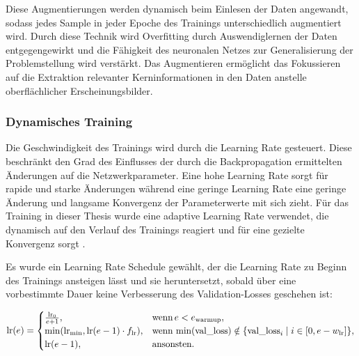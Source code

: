 \vspace{\baselineskip}

Diese Augmentierungen werden dynamisch beim Einlesen der Daten angewandt, sodass jedes Sample in jeder Epoche des Trainings unterschiedlich augmentiert wird. Durch diese Technik wird Overfitting durch Auswendiglernen der Daten entgegengewirkt und die Fähigkeit des neuronalen Netzes zur Generalisierung der Problemstellung wird verstärkt. Das Augmentieren ermöglicht das Fokussieren auf die Extraktion relevanter Kerninformationen in den Daten anstelle oberflächlicher Erscheinungsbilder.

\subsubsection{Dynamisches Training}

Die Geschwindigkeit des Trainings wird durch die Learning Rate gesteuert. Diese beschränkt den Grad des Einflusses der durch die Backpropagation ermittelten Änderungen auf die Netzwerkparameter. Eine hohe Learning Rate sorgt für rapide und starke Änderungen während eine geringe Learning Rate eine geringe Änderung und langsame Konvergenz der Parameterwerte mit sich zieht. Für das Training in dieser Thesis wurde eine adaptive Learning Rate verwendet, die dynamisch auf den Verlauf des Trainings reagiert und für eine gezielte Konvergenz sorgt \cite{adaptive_lr_schedule}.

Es wurde ein Learning Rate Schedule gewählt, der die Learning Rate zu Beginn des Trainings ansteigen lässt und sie heruntersetzt, sobald über eine vorbestimmte Dauer keine Verbesserung des Validation-Losses geschehen ist:

\begin{equation*}
    \text{lr}(e) =
    \begin{cases}
        \frac{\text{lr}_0}{e+1},                            & \text{wenn\,} e < e_\text{warmup},                                                     \\
        \min(\text{lr}_\text{min}, \text{lr}(e-1) \cdot f_\text{lr}), & \text{wenn\,} \min(\text{val\_loss}) \notin \{\text{val\_loss}_i \mid i \in [0,e-w_\text{lr}]\}, \\
        \text{lr}(e-1),                                     & \text{ansonsten.}
    \end{cases}
\end{equation*}

